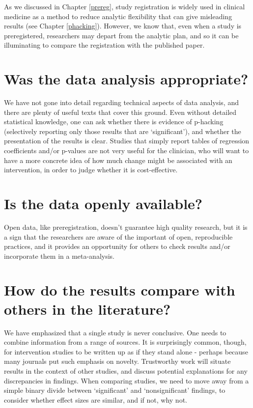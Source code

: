 \documentclass{krantz}
\begin{document}
As we discussed in Chapter \ref{prereg}, study registration is widely used in clinical medicine as a method to reduce analytic flexibility that can give misleading results (see Chapter \ref{phacking}). However, we know that, even when a study is preregistered, researchers may depart from the analytic plan, and so it can be illuminating to compare the registration with the published paper.

\hypertarget{was-the-data-analysis-appropriate}{%
\section{Was the data analysis appropriate?}\label{was-the-data-analysis-appropriate}}

We have not gone into detail regarding technical aspects of data analysis, and there are plenty of useful texts that cover this ground. Even without detailed statistical knowledge, one can ask whether there is evidence of p-hacking (selectively reporting only those results that are `significant'), and whether the presentation of the results is clear. Studies that simply report tables of regression coefficients and/or p-values are not very useful for the clinician, who will want to have a more concrete idea of how much change might be associated with an intervention, in order to judge whether it is cost-effective.

\hypertarget{is-the-data-openly-available}{%
\section{Is the data openly available?}\label{is-the-data-openly-available}}

Open data, like preregistration, doesn't guarantee high quality research, but it is a sign that the researchers are aware of the important of open, reproducible practices, and it provides an opportunity for others to check results and/or incorporate them in a meta-analysis.

\hypertarget{how-do-the-results-compare-with-others-in-the-literature}{%
\section{How do the results compare with others in the literature?}\label{how-do-the-results-compare-with-others-in-the-literature}}

We have emphasized that a single study is never conclusive. One needs to combine information from a range of sources. It is surprisingly common, though, for intervention studies to be written up as if they stand alone - perhaps because many journals put such emphasis on novelty. Trustworthy work will situate results in the context of other studies, and discuss potential explanations for any discrepancies in findings. When comparing studies, we need to move away from a simple binary divide between `significant' and `nonsignificant' findings, to consider whether effect sizes are similar, and if not, why not.
\end{document}
